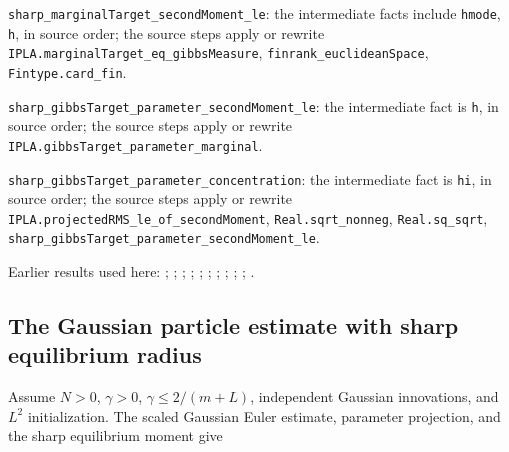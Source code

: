 \documentclass[11pt,a4paper]{report}
\begin{document}
\begin{leanbox}
\texttt{sharp\_\allowbreak{}marginal\allowbreak{}Target\_\allowbreak{}second\allowbreak{}Moment\_\allowbreak{}le}: the intermediate facts include \texttt{hmode}, \texttt{h}, in source order; the source steps apply or rewrite \texttt{IPLA.\allowbreak{}marginal\allowbreak{}Target\_\allowbreak{}eq\_\allowbreak{}gibbs\allowbreak{}Measure}, \texttt{finrank\_\allowbreak{}euclidean\allowbreak{}Space}, \texttt{Fintype.\allowbreak{}card\_\allowbreak{}fin}.



\texttt{sharp\_\allowbreak{}gibbs\allowbreak{}Target\_\allowbreak{}parameter\_\allowbreak{}second\allowbreak{}Moment\_\allowbreak{}le}: the intermediate fact is \texttt{h}, in source order; the source steps apply or rewrite \texttt{IPLA.\allowbreak{}gibbs\allowbreak{}Target\_\allowbreak{}parameter\_\allowbreak{}marginal}.



\texttt{sharp\_\allowbreak{}gibbs\allowbreak{}Target\_\allowbreak{}parameter\_\allowbreak{}concentration}: the intermediate fact is \texttt{hi}, in source order; the source steps apply or rewrite \texttt{IPLA.\allowbreak{}projected\allowbreak{}RMS\_\allowbreak{}le\_\allowbreak{}of\_\allowbreak{}second\allowbreak{}Moment}, \texttt{Real.\allowbreak{}sqrt\_\allowbreak{}nonneg}, \texttt{Real.\allowbreak{}sq\_\allowbreak{}sqrt}, \texttt{sharp\_\allowbreak{}gibbs\allowbreak{}Target\_\allowbreak{}parameter\_\allowbreak{}second\allowbreak{}Moment\_\allowbreak{}le}.
\end{leanbox}


Earlier results used here: \cite[Section~3.26.13]{LangevinLean2026ULASC}; \cite[Section~3.26.15]{LangevinLean2026ULASC}; \cite[Section~3.26.3]{LangevinLean2026ULASC}; \cite[Section~3.1.1]{LangevinLean2026IPLA}; \cite[Section~3.1.3]{LangevinLean2026IPLA}; \cite[Section~3.1.6]{LangevinLean2026IPLA}; \cite[Section~3.12.1]{LangevinLean2026IPLA}; \cite[Section~3.13.1]{LangevinLean2026IPLA}; \cite[Section~3.3.1]{LangevinLean2026IPLA}; \cite[Section~3.3.2]{LangevinLean2026IPLA}; \cite[Section~3.9.9]{LangevinLean2026IPLA}.
\subsection{\texorpdfstring{The Gaussian particle estimate with sharp equilibrium radius}{The Gaussian particle estimate with sharp equilibrium radius}}
\label{report-step-ProximalLangevin-SharpIPLA-lean-2}


Assume \(N>0\), \(\gamma>0\), \(\gamma\le2/(m+L)\), independent Gaussian innovations, and \(L^2\) initialization. The scaled Gaussian Euler estimate, parameter projection, and the sharp equilibrium moment give
\end{document}
